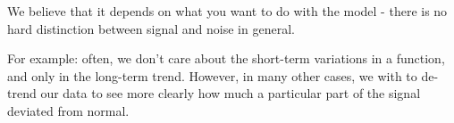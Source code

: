 We believe that it depends on what you want to do with the model - there is no hard distinction between signal and noise in general.

For example: often, we don't care about the short-term variations in a function, and only in the long-term trend.
However, in many other cases, we with to de-trend our data to see more clearly how much a particular part of the signal deviated from normal.


\fi











\outbpdocument{


}

